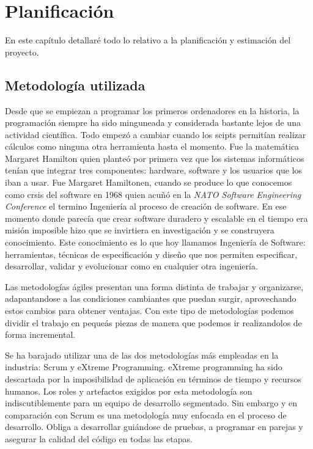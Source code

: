 \chapter{Planificación}
En este capítulo detallaré todo lo relativo a la planificación y estimación del proyecto. 

\section{Metodología utilizada}
Desde que se empiezan a programar los primeros ordenadores en la historia, la programación siempre ha sido 
minguneada y considerada bastante lejos de una actividad científica. Todo empezó a cambiar cuando los scipts
permitían realizar cálculos como ninguna otra herramienta hasta el momento. Fue la matemática Margaret Hamilton 
quien planteó por primera vez que los sistemas informáticos tenían que integrar tres componentes: hardware, 
software y los usuarios que los iban a usar. Fue Margaret Hamiltonen, cuando se produce lo que conocemos como 
crsis del software en 1968 quien acuñó en la \textit{NATO Software Engineering Conference} el termino Ingeniería 
al proceso de creación de software. En ese momento donde parecía que crear software duradero y escalable en el tiempo 
era misión imposible hizo que se invirtiera en investigación y se construyera conocimiento. Este conocimiento es lo que hoy 
llamamos Ingeniería de Software: herramientas, técnicas de especificación y diseño que nos permiten especificar, 
desarrollar, validar y evolucionar como en cualquier otra ingeniería.

Las metodologías ágiles presentan una forma distinta de trabajar y organizarse, adapantandose a las condiciones 
cambiantes que puedan surgir, aprovechando estos cambios para obtener ventajas. Con este tipo de metodologías 
podemos dividir el trabajo en pequeás piezas de manera que podemos ir realizandolos de forma incremental.

Se ha barajado utilizar una de las dos metodologías más empleadas en la industria: Scrum y eXtreme Programming. 
eXtreme programming ha sido descartada por la imposibilidad de aplicación en términos de tiempo y recursos humanos. 
Los roles y artefactos exigidos por esta metodología son indiscutiblemente para un equipo de desarrollo segmentado. 
Sin embargo y en comparación con Scrum es una metodología muy enfocada en el proceso de desarrollo. Obliga a 
desarrollar guiándose de pruebas, a programar en parejas y asegurar la calidad del código en todas las etapas.

